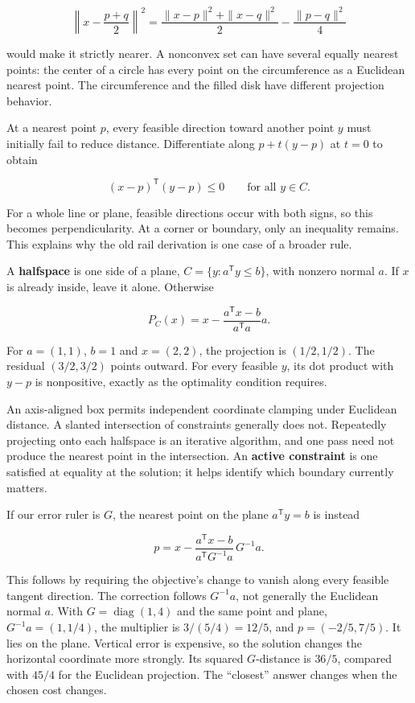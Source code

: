 \[
\left\|x-\frac{p+q}{2}\right\|^2
=\frac{\|x-p\|^2+\|x-q\|^2}{2}-\frac{\|p-q\|^2}{4}
\]

would make it strictly nearer. A nonconvex set can have several equally nearest points: the center of a circle has every point on the circumference as a Euclidean nearest point. The circumference and the filled disk have different projection behavior.

At a nearest point \(p\), every feasible direction toward another point \(y\) must initially fail to reduce distance. Differentiate along \(p+t(y-p)\) at \(t=0\) to obtain

\[
(x-p)^{\mathsf T}(y-p)\le0\qquad\text{for all }y\in C.
\]

For a whole line or plane, feasible directions occur with both signs, so this becomes perpendicularity. At a corner or boundary, only an inequality remains. This explains why the old rail derivation is one case of a broader rule.

A \textbf{halfspace} is one side of a plane, \(C=\{y:a^{\mathsf T}y\le b\}\), with nonzero normal \(a\). If \(x\) is already inside, leave it alone. Otherwise

\[
P_C(x)=x-\frac{a^{\mathsf T}x-b}{a^{\mathsf T}a}a.
\]

For \(a=(1,1)\), \(b=1\) and \(x=(2,2)\), the projection is \((1/2,1/2)\). The residual \((3/2,3/2)\) points outward. For every feasible \(y\), its dot product with \(y-p\) is nonpositive, exactly as the optimality condition requires.

An axis-aligned box permits independent coordinate clamping under Euclidean distance. A slanted intersection of constraints generally does not. Repeatedly projecting onto each halfspace is an iterative algorithm, and one pass need not produce the nearest point in the intersection. An \textbf{active constraint} is one satisfied at equality at the solution; it helps identify which boundary currently matters.

If our error ruler is \(G\), the nearest point on the plane \(a^{\mathsf T}y=b\) is instead

\[
p=x-\frac{a^{\mathsf T}x-b}{a^{\mathsf T}G^{-1}a}\,G^{-1}a.
\]

This follows by requiring the objective's change to vanish along every feasible tangent direction. The correction follows \(G^{-1}a\), not generally the Euclidean normal \(a\). With \(G=\operatorname{diag}(1,4)\) and the same point and plane, \(G^{-1}a=(1,1/4)\), the multiplier is \(3/(5/4)=12/5\), and \(p=(-2/5,7/5)\). It lies on the plane. Vertical error is expensive, so the solution changes the horizontal coordinate more strongly. Its squared \(G\)-distance is \(36/5\), compared with \(45/4\) for the Euclidean projection. The ``closest'' answer changes when the chosen cost changes.

